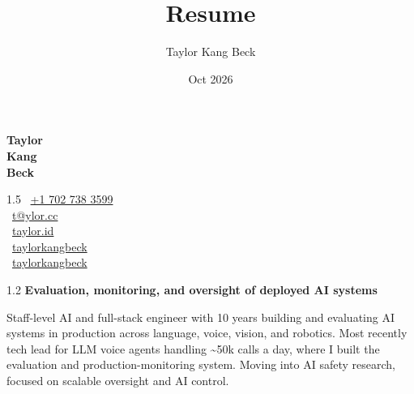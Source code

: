 \documentclass{my_cv}
\title{Resume}
\author{Taylor Kang Beck}
\date{Oct 2026}
\newcommand{\socialicon}[1]{\raisebox{-0.05em}{#1}}
\begin{document}

\noindent
\begin{minipage}[t]{0.19\textwidth}
    \vspace{0pt}
    {\Huge \textbf{Taylor \\ Kang \\ Beck}}
\end{minipage}%
\hfill
\begin{minipage}[t]{0.22\textwidth}
    \vspace{0pt}
    \begin{spacing}{1.5}
    \socialicon{\faPhone}~\href{tel:7027383599}{+1 702 738 3599} \\
    \socialicon{\faEnvelope}~\href{mailto:t@ylor.cc}{t@ylor.cc} \\
    \socialicon{\faGlobe}~\href{https://www.taylor.id}{taylor.id} \\
    \socialicon{\faGithub}~\href{https://github.com/taylorkangbeck}{taylorkangbeck} \\
    \socialicon{\faLinkedin}~\href{https://www.linkedin.com/in/taylorkangbeck/}{taylorkangbeck}
    \end{spacing}
\end{minipage}%
\hfill
\begin{minipage}[t]{0.53\textwidth}
    \vspace{0pt}
    \begin{spacing}{1.2}
        \noindent\textbf{Evaluation, monitoring, and oversight of deployed AI systems}\par
        \vspace{0.3em}
        \noindent Staff-level AI and full-stack engineer with 10 years building and evaluating AI systems in production across language, voice, vision, and robotics. Most recently tech lead for LLM voice agents handling \textasciitilde50k calls a day, where I built the evaluation and production-monitoring system. Moving into AI safety research, focused on scalable oversight and AI control.
    \end{spacing}
\end{minipage}

\end{document}
